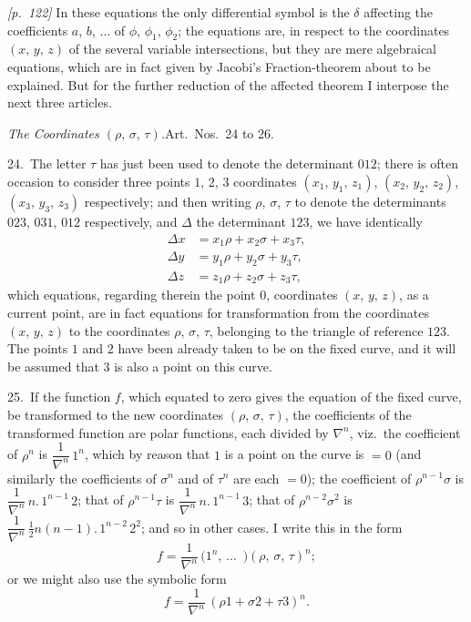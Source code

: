 \documentclass[11pt,a4paper]{article}
\theoremstyle{plain}
\theoremstyle{definition}
\theoremstyle{remark}
\begin{document}
\noindent\textit{[p.~122]} In these equations the only differential symbol is the $\delta$ affecting the coefficients $a$, $b$, $\ldots$ of $\phi$, $\phi_1$, $\phi_2$; the equations are, in respect to the coordinates $(x,\,y,\,z)$ of the several variable intersections, but they are mere algebraical equations, which are in fact given by Jacobi's Fraction-theorem about to be explained. But for the further reduction of the affected theorem I interpose the next three articles.

\textit{The Coordinates $(\rho,\,\sigma,\,\tau)$.}\quad Art.\ Nos.~24 to 26.

24.\ The letter $\tau$ has just been used to denote the determinant $012$; there is often occasion to consider three points $1$, $2$, $3$ coordinates $(x_1,\,y_1,\,z_1)$, $(x_2,\,y_2,\,z_2)$, $(x_3,\,y_3,\,z_3)$ respectively; and then writing $\rho$, $\sigma$, $\tau$ to denote the determinants $023$, $031$, $012$ respectively, and $\Delta$ the determinant $123$, we have identically
\begin{align*}
\Delta x &= x_1\rho + x_2\sigma + x_3\tau,\\
\Delta y &= y_1\rho + y_2\sigma + y_3\tau,\\
\Delta z &= z_1\rho + z_2\sigma + z_3\tau,
\end{align*}
which equations, regarding therein the point $0$, coordinates $(x,\,y,\,z)$, as a current point, are in fact equations for transformation from the coordinates $(x,\,y,\,z)$ to the coordinates $\rho$, $\sigma$, $\tau$, belonging to the triangle of reference $123$. The points $1$ and $2$ have been already taken to be on the fixed curve, and it will be assumed that $3$ is also a point on this curve.

25.\ If the function $f$, which equated to zero gives the equation of the fixed curve, be transformed to the new coordinates $(\rho,\,\sigma,\,\tau)$, the coefficients of the transformed function are polar functions, each divided by $\nabla^n$, viz.\ the coefficient of $\rho^n$ is $\dfrac{1}{\nabla^n}\,1^n$, which by reason that $1$ is a point on the curve is $= 0$ (and similarly the coefficients of $\sigma^n$ and of $\tau^n$ are each $= 0$); the coefficient of $\rho^{n-1}\sigma$ is $\dfrac{1}{\nabla^n}\,n.\,1^{n-1}\,2$; that of $\rho^{n-1}\tau$ is $\dfrac{1}{\nabla^n}\,n.\,1^{n-1}\,3$; that of $\rho^{n-2}\sigma^2$ is $\dfrac{1}{\nabla^n}\,\tfrac{1}{2}n(n - 1).\,1^{n-2}\,2^2$; and so in other cases. I write this in the form
\[
f = \frac{1}{\nabla^n}\,(1^n,\,\ldots\!{\,\,\,)}(\rho,\,\sigma,\,\tau)^n;
\]
or we might also use the symbolic form
\[
f = \frac{1}{\nabla^n}\,(\rho 1 + \sigma 2 + \tau 3)^n.
\]
\end{document}
